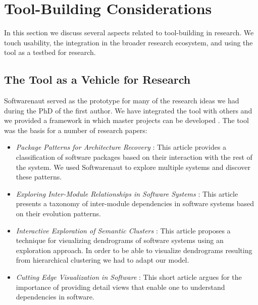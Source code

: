 \documentclass[preprint,12pt]{elsarticle}
\begin{document}
\section {Tool-Building Considerations} \label {sec:disc}

In this section we discuss several aspects related to tool-building in research. We touch usability, the integration in the broader research ecosystem, and using the tool as a testbed for research.


\subsection {The Tool as a Vehicle for Research}
Softwarenaut served as the prototype for many of the research ideas we had during the PhD of the first author. We have integrated the tool with others \cite{lungu-clust, lungu-scico, nier-story} and we provided a framework in which master projects can be developed \cite{boeckmann-mars}. %
The tool was the basis for a number of research papers: 
\begin{itemize}
\item {\em Package Patterns for Architecture Recovery} \cite{lungu-packages}: This article provides a classification of software packages based on their interaction with the rest of the system. We used Softwarenaut to explore multiple systems and discover these patterns.
\item {\em Exploring Inter-Module Relationships in Software Systems} \cite{lungu-relevo}: This article presents a taxonomy of inter-module dependencies in software systems based on their evolution patterns.
\item {\em Interactive Exploration of Semantic Clusters} \cite{lungu-clust}: This article proposes a technique for visualizing dendrograms of software systems using an exploration approach. In order to be able to visualize {dendrograms} resulting from hierarchical clustering we had to adapt our model.
\item {\em Cutting Edge Visualization in Software} \cite{lungu-cutedge}: This short article argues for the importance of providing detail views that enable one to understand dependencies in software.
\end{itemize}

\end{document}

